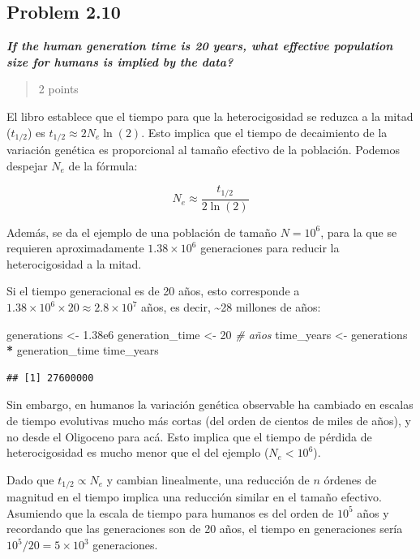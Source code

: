 \documentclass[
  11pt,
]{article}
\newenvironment{Shaded}{\begin{snugshade}}{\end{snugshade}}
\newcommand{\CommentTok}[1]{\textcolor[rgb]{0.56,0.35,0.01}{\textit{#1}}}
\newcommand{\DecValTok}[1]{\textcolor[rgb]{0.00,0.00,0.81}{#1}}
\newcommand{\FloatTok}[1]{\textcolor[rgb]{0.00,0.00,0.81}{#1}}
\newcommand{\NormalTok}[1]{#1}
\newcommand{\OtherTok}[1]{\textcolor[rgb]{0.56,0.35,0.01}{#1}}
\newcommand{\SpecialCharTok}[1]{\textcolor[rgb]{0.81,0.36,0.00}{\textbf{#1}}}
\begin{document}
\subsection{Problem 2.10}\label{problem-2.10}

\textbf{\emph{If the human generation time is 20 years, what effective
population size for humans is implied by the data?}}

\begin{quote}
2 points
\end{quote}

El libro establece que el tiempo para que la heterocigosidad se reduzca
a la mitad (\(t_{1/2}\)) es \(t_{1/2} \approx 2N_e \ln(2)\). Esto
implica que el tiempo de decaimiento de la variación genética es
proporcional al tamaño efectivo de la población. Podemos despejar
\(N_e\) de la fórmula:

\[
N_e \approx \frac{t_{1/2}}{2 \ln(2)}
\]

Además, se da el ejemplo de una población de tamaño \(N = 10^6\), para
la que se requieren aproximadamente \(1.38 \times 10^6\) generaciones
para reducir la heterocigosidad a la mitad.

Si el tiempo generacional es de 20 años, esto corresponde a
\(1.38 \times 10^6 \times 20 \approx 2.8 \times 10^7\) años, es decir,
\textasciitilde28 millones de años:

\begin{Shaded}
\begin{Highlighting}[]
\NormalTok{generations }\OtherTok{\textless{}{-}} \FloatTok{1.38e6}
\NormalTok{generation\_time }\OtherTok{\textless{}{-}} \DecValTok{20} \CommentTok{\# años}
\NormalTok{time\_years }\OtherTok{\textless{}{-}}\NormalTok{ generations }\SpecialCharTok{*}\NormalTok{ generation\_time}
\NormalTok{time\_years}
\end{Highlighting}
\end{Shaded}

\begin{verbatim}
## [1] 27600000
\end{verbatim}

Sin embargo, en humanos la variación genética observable ha cambiado en
escalas de tiempo evolutivas mucho más cortas (del orden de cientos de
miles de años), y no desde el Oligoceno para acá. Esto implica que el
tiempo de pérdida de heterocigosidad es mucho menor que el del ejemplo
(\(N_e < 10^6\)).

Dado que \(t_{1/2} \propto N_e\) y cambian linealmente, una reducción de
\(n\) órdenes de magnitud en el tiempo implica una reducción similar en
el tamaño efectivo. Asumiendo que la escala de tiempo para humanos es
del orden de \(10^5\) años y recordando que las generaciones son de 20
años, el tiempo en generaciones sería \(10^5 / 20 = 5 \times 10^3\)
generaciones.
\end{document}
